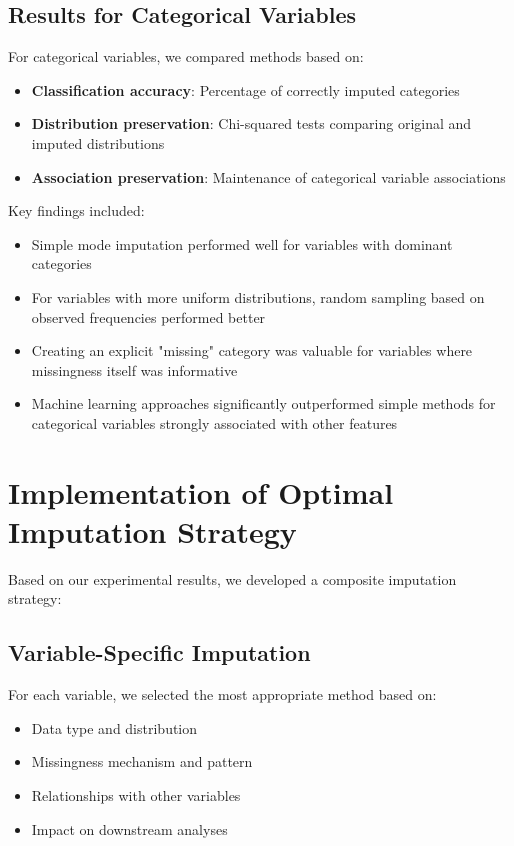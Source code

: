 \subsection{Results for Categorical Variables}
For categorical variables, we compared methods based on:
\begin{itemize}
    \item \textbf{Classification accuracy}: Percentage of correctly imputed categories
    \item \textbf{Distribution preservation}: Chi-squared tests comparing original and imputed distributions
    \item \textbf{Association preservation}: Maintenance of categorical variable associations
\end{itemize}

Key findings included:
\begin{itemize}
    \item Simple mode imputation performed well for variables with dominant categories
    \item For variables with more uniform distributions, random sampling based on observed frequencies performed better
    \item Creating an explicit "missing" category was valuable for variables where missingness itself was informative
    \item Machine learning approaches significantly outperformed simple methods for categorical variables strongly associated with other features
\end{itemize}

\section{Implementation of Optimal Imputation Strategy}
Based on our experimental results, we developed a composite imputation strategy:

\subsection{Variable-Specific Imputation}
For each variable, we selected the most appropriate method based on:
\begin{itemize}
    \item Data type and distribution
    \item Missingness mechanism and pattern
    \item Relationships with other variables
    \item Impact on downstream analyses
\end{itemize}

